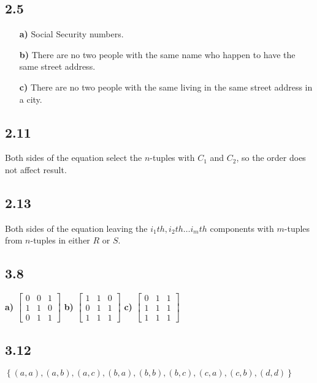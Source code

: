 \documentclass[10pt]{ctexart}
\begin{document}
    \subsection*{2.5}
        \begin{itemize}
            \item [\textbf{a)}] Social Security numbers.
            \item [\textbf{b)}] There are no two people with the same name who happen to have the same street address.
            \item [\textbf{c)}] There are no two people with the same living in the same street address in a city.
        \end{itemize}
    \subsection*{2.11}
        Both sides of the equation select the $n$-tuples with $C_1$ and $C_2$, so the order does not affect result.
    \subsection*{2.13}
        Both sides of the equation leaving the $i_1th, i_2th \ldots i_mth$ components with $m$-tuples from $n$-tuples in either $R$ or $S$.
    \subsection*{3.8}
        \textbf{a)}
            $\begin{bmatrix}
                0 & 0 & 1 \\
                1 & 1 & 0 \\
                0 & 1 & 1
            \end{bmatrix}$
        \textbf{b)}
            $\begin{bmatrix}
                1 & 1 & 0 \\
                0 & 1 & 1 \\
                1 & 1 & 1
            \end{bmatrix}$
        \textbf{c)}
            $\begin{bmatrix}
                0 & 1 & 1 \\
                1 & 1 & 1 \\
                1 & 1 & 1
            \end{bmatrix}$
    \subsection*{3.12}
        $\left\{(a, a), (a, b), (a, c), (b, a), (b, b), (b, c), (c, a), (c, b), (d, d)\right\}$
\end{document}
